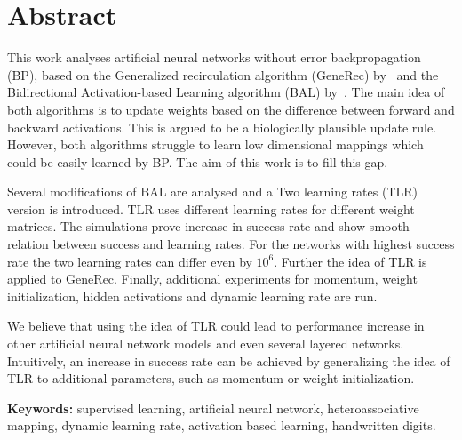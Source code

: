
\section*{Abstract}

This work analyses artificial neural networks without error backpropagation (BP), based on the Generalized recirculation algorithm (GeneRec) by~\citet{o1996bio} and the Bidirectional Activation-based Learning algorithm (BAL) by~\citet{farkas2013bal}. The main idea of both algorithms is to update weights based on the difference between forward and backward activations. This is argued to be a biologically plausible update rule. However, both algorithms struggle to learn low dimensional mappings which could be easily learned by BP. The aim of this work is to fill this gap. 

Several modifications of BAL are analysed and a Two learning rates (TLR) version is introduced. TLR uses different learning rates for different weight matrices. The simulations prove increase in success rate and show smooth relation between success and learning rates. For the networks with highest success rate the two learning rates can differ even by $10^6$. Further the idea of TLR is applied to GeneRec. Finally, additional experiments for momentum, weight initialization, hidden activations and dynamic learning rate are run. 

We believe that using the idea of TLR could lead to performance increase in other artificial neural network models and even several layered networks. Intuitively, an increase in success rate can be achieved by generalizing the idea of TLR to additional parameters, such as momentum or weight initialization. 

\begin{flushleft}
  \textbf{Keywords:} supervised learning, artificial neural network, heteroassociative mapping, dynamic learning rate, activation based learning, handwritten digits. 
\end{flushleft}


